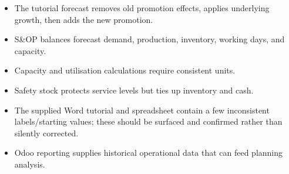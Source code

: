 \begin{chapterrecap}
\begin{itemize}
  \item The tutorial forecast removes old promotion effects, applies underlying growth, then adds the new promotion.
  \item S\&OP balances forecast demand, production, inventory, working days, and capacity.
  \item Capacity and utilisation calculations require consistent units.
  \item Safety stock protects service levels but ties up inventory and cash.
  \item The supplied Word tutorial and spreadsheet contain a few inconsistent labels/starting values; these should be surfaced and confirmed rather than silently corrected.
  \item Odoo reporting supplies historical operational data that can feed planning analysis.
\end{itemize}
\end{chapterrecap}
